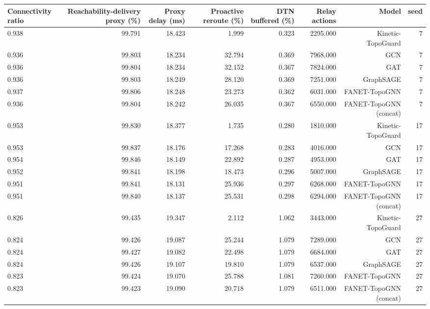 \begin{tabular}{lrrrrrrr}
\toprule
Connectivity ratio & Reachability-delivery proxy (\%) & Proxy delay (ms) & Proactive reroute (\%) & DTN buffered (\%) & Relay actions & Model & seed \\
\midrule
0.938 & 99.791 & 18.423 & 1.999 & 0.323 & 2295.000 & Kinetic-TopoGuard & 7 \\
0.936 & 99.803 & 18.234 & 32.794 & 0.369 & 7968.000 & GCN & 7 \\
0.936 & 99.804 & 18.234 & 32.152 & 0.367 & 7824.000 & GAT & 7 \\
0.936 & 99.803 & 18.249 & 28.120 & 0.369 & 7251.000 & GraphSAGE & 7 \\
0.937 & 99.806 & 18.248 & 23.273 & 0.362 & 6031.000 & FANET-TopoGNN & 7 \\
0.936 & 99.804 & 18.242 & 26.035 & 0.367 & 6550.000 & FANET-TopoGNN (concat) & 7 \\
0.953 & 99.830 & 18.377 & 1.735 & 0.280 & 1810.000 & Kinetic-TopoGuard & 17 \\
0.953 & 99.837 & 18.176 & 17.268 & 0.283 & 4016.000 & GCN & 17 \\
0.954 & 99.846 & 18.149 & 22.892 & 0.287 & 4953.000 & GAT & 17 \\
0.952 & 99.841 & 18.198 & 18.473 & 0.296 & 5007.000 & GraphSAGE & 17 \\
0.951 & 99.841 & 18.131 & 25.936 & 0.297 & 6268.000 & FANET-TopoGNN & 17 \\
0.951 & 99.840 & 18.137 & 25.531 & 0.298 & 6294.000 & FANET-TopoGNN (concat) & 17 \\
0.826 & 99.435 & 19.347 & 2.112 & 1.062 & 3443.000 & Kinetic-TopoGuard & 27 \\
0.824 & 99.426 & 19.087 & 25.244 & 1.079 & 7289.000 & GCN & 27 \\
0.824 & 99.427 & 19.082 & 22.498 & 1.079 & 6684.000 & GAT & 27 \\
0.824 & 99.426 & 19.107 & 19.810 & 1.079 & 6537.000 & GraphSAGE & 27 \\
0.823 & 99.424 & 19.070 & 25.788 & 1.081 & 7260.000 & FANET-TopoGNN & 27 \\
0.823 & 99.423 & 19.090 & 20.718 & 1.079 & 6511.000 & FANET-TopoGNN (concat) & 27 \\
\bottomrule
\end{tabular}